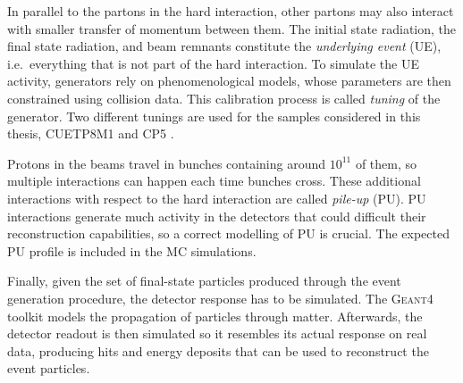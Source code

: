 \documentclass[../main.tex]{subfiles}
\begin{document}
In parallel to the partons in the hard interaction, other partons may also interact with smaller transfer of momentum between them. The initial state radiation, the final state radiation, and beam remnants constitute the \textit{underlying event} (UE), i.e.~everything that is not part of the hard interaction. To simulate the UE activity, generators rely on phenomenological models, whose parameters are then constrained using collision data. This calibration process is called \textit{tuning} of the generator. Two different tunings are used for the samples considered in this thesis, CUETP8M1 \cite{intro:theo:CUETP8M1} and CP5 \cite{intro:theo:CP5}.

Protons in the beams travel in bunches containing around $10^{11}$ of them, so multiple interactions can happen each time bunches cross. These additional interactions with respect to the hard interaction are called \textit{pile-up} (PU). PU interactions generate much activity in the detectors that could difficult their reconstruction capabilities, so a correct modelling of PU is crucial. The expected PU profile is included in the MC simulations.



Finally, given the set of final-state particles produced through the event generation procedure, the detector response has to be simulated. The \textsc{Geant4} toolkit \cite{geant} models the propagation of particles through matter. Afterwards, the detector readout is then simulated so it resembles its actual response on real data, producing hits and energy deposits that can be used to reconstruct the event particles.
\end{document}
